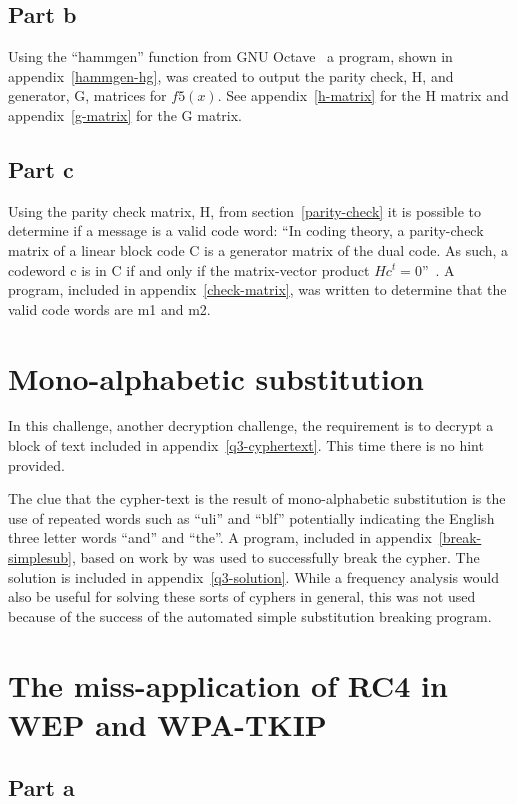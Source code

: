 \documentclass[pdftex, 12pt, a4paper]{article}
\begin{document}
\subsection{Part b}
Using the ``hammgen'' function from GNU Octave~\cite{hammgen-octave} a program,
shown in appendix~\ref{hammgen-hg}, was created to output the parity check,
H\label{parity-check}, and generator, G, matrices for $f5(x)$.
See appendix~\ref{h-matrix} for the H matrix and appendix~\ref{g-matrix} for the
G matrix.

\subsection{Part c}
Using the parity check matrix, H, from section~\ref{parity-check} it is possible
to determine if a message is a valid code word: ``In coding theory, a
parity-check matrix of a linear block code C is a generator matrix of the dual
code. As such, a codeword c is in C if and only if the matrix-vector product
$Hc^t = 0$''~\cite{check-matrix}. A program, included in
appendix~\ref{check-matrix}, was written to determine that the valid code words
are m1 and m2.

\section{Mono-alphabetic substitution}\label{mono}
In this challenge, another decryption challenge, the requirement is to decrypt a
block of text included in appendix~\ref{q3-cyphertext}. This time there is no
hint provided.

The clue that the cypher-text is the result of mono-alphabetic
substitution is the use of repeated words such as ``uli'' and ``blf''
potentially indicating the English three letter words ``and'' and ``the''.
A program, included in appendix~\ref{break-simplesub}, based on work by
\textcite{stochastic-searching} was used to successfully break the cypher.
The solution is included in appendix~\ref{q3-solution}.
While a frequency analysis would also be useful for solving these sorts of cyphers in
general, this was not used because of the success of the automated simple
substitution breaking program.

\section{The miss-application of RC4 in WEP and WPA-TKIP}\label{conclusions}

\subsection{Part a}
\end{document}
